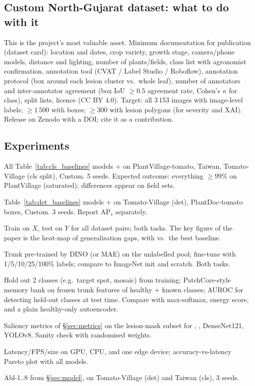 \subsection{Custom North-Gujarat dataset: what to do with it}
\label{sec:custom_dataset}
This is the project's most valuable asset. Minimum documentation for publication (dataset card): location and dates, crop variety, growth stage, camera/phone models, distance and lighting, number of plants/fields, class list with agronomist confirmation, annotation tool (CVAT / Label Studio / Roboflow), annotation protocol (box around each lesion cluster vs.\ whole leaf), number of annotators and inter-annotator agreement (box IoU $\ge 0.5$ agreement rate, Cohen's $\kappa$ for class), split lists, licence (CC BY 4.0). Target: all 3\,153 images with image-level labels; $\ge 1\,500$ with boxes; $\ge 300$ with lesion polygons (for severity and XAI). Release on Zenodo with a DOI; cite it as a contribution.

\subsection{Experiments}
\begin{description}[style=nextline]
  \item[E1 -- In-domain classification.] All Table~\ref{tab:cls_baselines} models + \modelcls{} on PlantVillage-tomato, Taiwan, Tomato-Village (cls split), Custom. 5 seeds. Expected outcome: everything $\ge 99\%$ on PlantVillage (saturated); differences appear on field sets.
  \item[E2 -- In-domain detection.] Table~\ref{tab:det_baselines} models + \modeldet{} on Tomato-Village (det), PlantDoc-tomato boxes, Custom. 3 seeds. Report AP$_s$ separately.
  \item[E3 -- Cross-domain.] Train on $X$, test on $Y$ for all dataset pairs; both tasks. The key figure of the paper is the heat-map of generalisation gaps, with \model{} vs.\ the best baseline.
  \item[E4 -- Label efficiency / SSL.] Trunk pre-trained by DINO (or MAE) on the unlabelled pool; fine-tune with 1/5/10/25/100\% labels; compare to ImageNet init and scratch. Both tasks.
  \item[E5 -- Unknown-disease flagging.] Hold out 2 classes (e.g.\ target spot, mosaic) from training; PatchCore-style memory bank on frozen trunk features of healthy + known classes; AUROC for detecting held-out classes at test time. Compare with max-softmax, energy score, and a plain healthy-only autoencoder.
  \item[E6 -- Quantitative XAI.] Saliency metrics of \S\ref{sec:metrics} on the lesion-mask subset for \modelcls{}, \modeldet{}, DenseNet121, YOLOv8. Sanity check with randomised weights.
  \item[E7 -- Efficiency.] Latency/FPS/size on GPU, CPU, and one edge device; accuracy-vs-latency Pareto plot with all models.
  \item[E8 -- Ablations.] Abl-1..8 from \S\ref{sec:model}, on Tomato-Village (det) and Taiwan (cls), 3 seeds.
\end{description}

